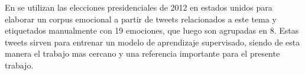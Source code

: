 En \cite{mohammad2015sentiment} se utilizan las elecciones presidenciales de 2012 en estados unidos para elaborar un corpus emocional a partir de tweets relacionados a este tema y etiquetados manualmente con 19 emociones, que luego son agrupadas en 8. Estas tweets sirven para entrenar un modelo de aprendizaje supervisado, siendo de esta manera el trabajo mas cercano y una referencia importante para el presente trabajo.














